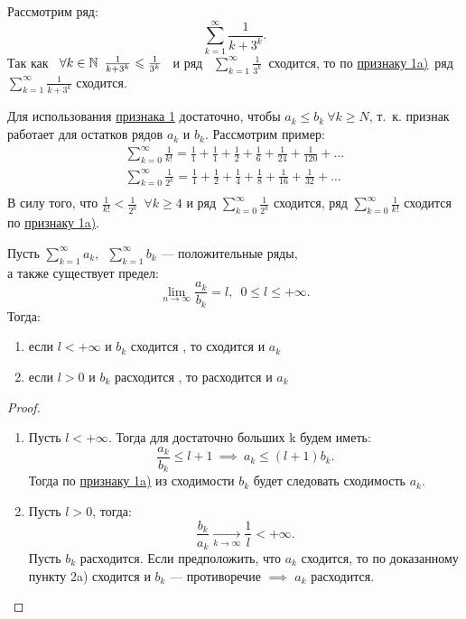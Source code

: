 \documentclass[../../main.tex]{subfiles}
\begin{document}
\begin{example}
	Рассмотрим ряд:
	\[
		 \sum\limits_{k = 1}^\infty\frac{1}{k + 3^k}
	.\]
	Так как \  $\forall k \in \mathbb{N} \enspace
	 \frac{1}{{k + 3^k}} \leqslant \frac{1}{3^k}$ \  и ряд 
	\ $\sum\limits_{k = 1}^\infty \frac{1}{3^k}$\   сходится,
	то по \hyperref[lec26:comp_test_1]{признаку  1\textdegree a)}\ ряд
	$ \sum\limits_{k = 1}^\infty\frac{1}{k + 3^k}$ сходится.
\end{example}
 \begin{rem}
Для использования \hyperref[lec26:comp_test_1]{признака  1\textdegree} 
достаточно, чтобы $a_k \leq b_k\ \forall k\geq N$, т.~к.
признак работает для  остатков рядов $a_k$ и $b_k$. Рассмотрим пример:
\begin{gather*}
	\sum\limits_{k = 0}^\infty\frac{1}{k!} = \frac{1}{1} + 
	\frac{1}{1} +  \frac{1}{2} +  \frac{1}{6} +
	\frac{1}{24} +  \frac{1}{120} + \ldots\\
	\sum\limits_{k = 0}^\infty\frac{1}{2^k} = \frac{1}{1} + 
	\frac{1}{2} +  \frac{1}{4} +  \frac{1}{8} +
	\frac{1}{16} +  \frac{1}{32} + \ldots\\
\end{gather*}
	В силу того, что \enspace
	$\frac{1}{k!} < \frac{1}{2^k} \enspace \forall k \geq 4$
	\enspace и ряд $\sum\limits_{k = 0}^\infty\frac{1}{2^k}$ сходится,
	ряд $\sum\limits_{k = 0}^\infty\frac{1}{k!}$ сходится по
	 \hyperref[lec26:comp_test_1]{признаку  1\textdegree a)}.
 \end{rem}
  \begin{thm}
 	\label{lec26:comp_test_2}
 	Пусть $\sum\limits_{k = 1}^\infty a_k,\enspace \sum\limits_{k = 1}^\infty b_k$
 	 --- положительные ряды,\\ 
 	а также существует предел:
 	\[
 	\lim\limits_{n \to \infty}\frac{a_k}{b_k} = l,\enspace 0 \leq l \leq +\infty
 	.\]
	Тогда:
	\begin{enumerate}[label={\alph*)}]
	\item если $l < +\infty$ и $b_k$ сходится , то сходится и $a_k$
	\item если $l > 0$ и $b_k$ расходится , то расходится и $a_k$
	\end{enumerate}
 \end{thm}
 \begin{proof}
	\begin{enumerate}[label={\alph*)}]
	\item Пусть $l< +\infty$.
	Тогда для достаточно больших k будем иметь:
	 \[
	 	\frac{a_k}{b_k} \leq l + 1 \  \implies \ a_k \leq (l+1)b_k
	 .\]
	Тогда по \hyperref[lec26:comp_test_1]{признаку  1\textdegree a)} из 
	 сходимости $b_k$ будет следовать сходимость $a_k$.
	\item Пусть $l > 0$, тогда:
	\[
	\frac{b_k}{a_k} \xrightarrow[k \to \infty]{} \frac{1}{l} < +\infty
	.\]
	Пусть $b_k$ расходится. Если предположить,
	что $a_k$  сходится, то по доказанному пункту
	2\textdegree a) сходится и $b_k$ --- противоречие 
	$\implies$ $a_k$ расходится.
	\end{enumerate}
\end{proof}
\end{document}

